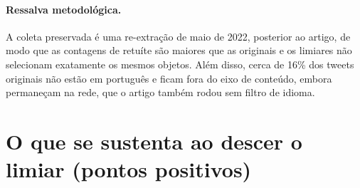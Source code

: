 \paragraph{Ressalva metodológica.} A coleta preservada é uma re-extração de maio de
2022, posterior ao artigo, de modo que as contagens de retuíte são maiores que as
originais e os limiares não selecionam exatamente os mesmos objetos. Além disso,
cerca de 16\% dos tweets originais não estão em português e ficam fora do eixo de
conteúdo, embora permaneçam na rede, que o artigo também rodou sem filtro de
idioma.

\section{O que se sustenta ao descer o limiar (pontos positivos)}

